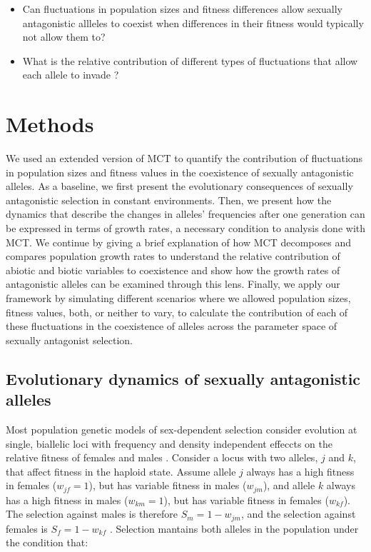\documentclass[]{article}
\begin{document}
\begin{itemize}
	\item Can fluctuations in population sizes and fitness differences allow sexually antagonistic allleles to coexist when differences in their fitness would typically not allow them to?
	\item What is the relative contribution of different types of fluctuations that allow each allele to invade ?
\end{itemize}

\clearpage
\section{Methods}

We used an extended version of MCT to quantify the contribution of fluctuations in population sizes and fitness values in the coexistence of sexually antagonistic alleles. As a baseline, we first present the evolutionary consequences of sexually antagonistic selection in constant environments. Then, we present how the dynamics that describe the changes in alleles' frequencies after one generation can be expressed in terms of growth rates, a necessary condition to analysis done with MCT. We continue by giving a brief explanation of how MCT decomposes and compares population growth rates to understand the relative contribution of abiotic and biotic variables to coexistence and show how the growth rates of antagonistic alleles can be examined through this lens. Finally, we apply our framework by simulating different scenarios where we allowed population sizes, fitness values, both, or neither to vary, to calculate the contribution of each of these fluctuations in the coexistence of alleles across the parameter space of sexually antagonist selection.


\subsection*{Evolutionary dynamics of sexually antagonistic alleles}

 Most population genetic models of sex-dependent selection consider evolution at single, biallelic  loci with frequency and density independent effeccts on the relative fitness of females and males \citep{wright1942statistical,kidwell1977regions, immler2012ploidally}. Consider a locus with two alleles, $j$ and $k$, that affect fitness in the haploid state.  Assume allele $j$ always has a high fitness in females ($w_{jf} = 1$), but has variable fitness in males ($w_{jm}$), and allele $k$ always has a high fitness in males ($w_{km} = 1$), but has variable fitness in females ($w_{kf}$). The selection against males is therefore $S_{m}= 1 - w_{jm}$, and the selection against females is $S_{f}= 1 - w_{kf}$ . Selection mantains both alleles in the population under the condition that:
\end{document}
